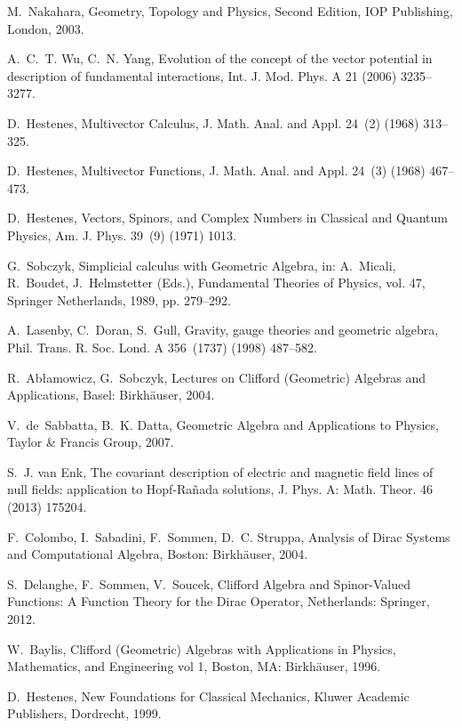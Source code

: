 \documentclass[1p,sort&compress]{elsarticle}
\numberwithin{equation}{section}
\begin{document}
\begin{thebibliography}{999}
M.~Nakahara, {Geometry, Topology and Physics, Second Edition}, IOP Publishing,
  London, 2003.

A.~C.~T. Wu, C.~N. Yang, {Evolution of the concept of the vector potential in
  description of fundamental interactions}, Int. J. Mod. Phys. A 21 (2006)
  3235--3277.

D.~Hestenes, {Multivector Calculus}, J. Math. Anal. and Appl. 24~(2) (1968)
  313--325.

D.~Hestenes, {Multivector Functions}, J. Math. Anal. and Appl. 24~(3) (1968)
  467--473.

D.~Hestenes, {Vectors, Spinors, and Complex Numbers in Classical and Quantum
  Physics}, Am. J. Phys. 39~(9) (1971) 1013.

G.~Sobczyk, {Simplicial calculus with Geometric Algebra}, in: A.~Micali,
  R.~Boudet, J.~Helmstetter (Eds.), {Fundamental Theories of Physics, vol. 47},
  Springer Netherlands, 1989, pp. 279--292.

A.~Lasenby, C.~Doran, S.~Gull, {Gravity, gauge theories and geometric algebra},
  Phil. Trans. R. Soc. Lond. A 356~(1737) (1998) 487--582.

R.~Ab{\l}amowicz, G.~Sobczyk, {Lectures on Clifford (Geometric) Algebras and
  Applications}, Basel: Birkh\"{a}user, 2004.

V.~de~Sabbatta, B.~K. Datta, {Geometric Algebra and Applications to Physics},
  Taylor \& Francis Group, 2007.

S.~J. van Enk, {The covariant description of electric and magnetic field lines
  of null fields: application to Hopf-Ra\~{n}ada solutions}, J. Phys. A: Math.
  Theor. 46 (2013) 175204.

F.~Colombo, I.~Sabadini, F.~Sommen, D.~C. Struppa, {Analysis of Dirac Systems
  and Computational Algebra}, Boston: Birkh\"auser, 2004.

S.~Delanghe, F.~Sommen, V.~Soucek, {Clifford Algebra and Spinor-Valued
  Functions: A Function Theory for the Dirac Operator}, Netherlands: Springer,
  2012.

W.~Baylis, {Clifford (Geometric) Algebras with Applications in Physics,
  Mathematics, and Engineering vol 1}, Boston, MA: Birkh\"{a}user, 1996.

D.~Hestenes, {New Foundations for Classical Mechanics}, Kluwer Academic
  Publishers, Dordrecht, 1999.


\end{thebibliography}
\end{document}

